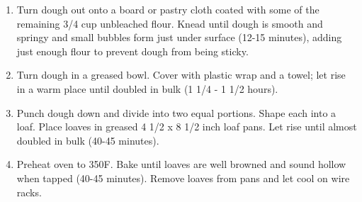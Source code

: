 \documentclass[11pt, twoside, openany]{book}
\begin{document}
\begin{minipage}[t]{\linewidth}
\begin{enumerate}
\item Turn dough out onto a board or pastry cloth coated with some of the remaining 3/4 cup unbleached flour. Knead until dough is smooth and springy and small bubbles form just under surface (12-15 minutes), adding just enough flour to prevent dough from being sticky.
\item Turn dough in a greased bowl. Cover with plastic wrap and a towel; let rise in a warm place until doubled in bulk (1 1/4 - 1 1/2 hours).
\item Punch dough down and divide into two equal portions. Shape each into a loaf. Place loaves in greased 4 1/2 x 8 1/2 inch loaf pans. Let rise until almost doubled in bulk (40-45 minutes).
\item Preheat oven to 350F. Bake until loaves are well browned and sound hollow when tapped (40-45 minutes). Remove loaves from pans and let cool on wire racks.
\end{enumerate}
\end{minipage}\vspace{8mm}
\end{document}
